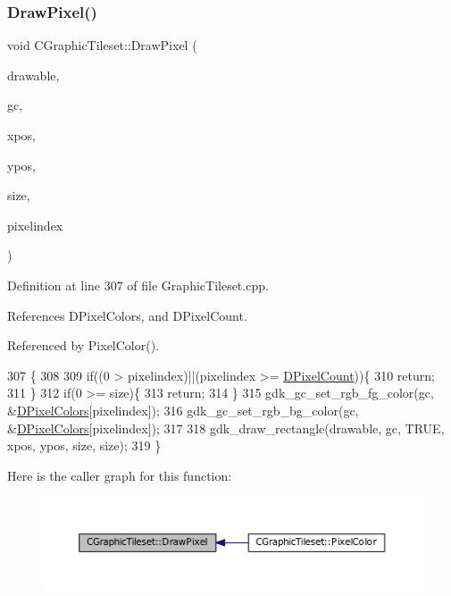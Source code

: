 \subsubsection{\texorpdfstring{Draw\+Pixel()}{DrawPixel()}}
{\footnotesize\ttfamily void C\+Graphic\+Tileset\+::\+Draw\+Pixel (\begin{DoxyParamCaption}\item[{Gdk\+Drawable $\ast$}]{drawable,  }\item[{Gdk\+GC $\ast$}]{gc,  }\item[{gint}]{xpos,  }\item[{gint}]{ypos,  }\item[{int}]{size,  }\item[{int}]{pixelindex }\end{DoxyParamCaption})}



Definition at line 307 of file Graphic\+Tileset.\+cpp.



References D\+Pixel\+Colors, and D\+Pixel\+Count.



Referenced by Pixel\+Color().


\begin{DoxyCode}
307                                                                                                            
          \{
308 
309     \textcolor{keywordflow}{if}((0 > pixelindex)||(pixelindex >= \hyperlink{classCGraphicTileset_a55fc9ceb1c92383c124e61c911fe57db}{DPixelCount}))\{
310         \textcolor{keywordflow}{return};
311     \}
312     \textcolor{keywordflow}{if}(0 >= size)\{
313         \textcolor{keywordflow}{return};
314     \}
315     gdk\_gc\_set\_rgb\_fg\_color(gc, &\hyperlink{classCGraphicTileset_a4e9672b8b133dbac600fb8bb400d1cb3}{DPixelColors}[pixelindex]);
316     gdk\_gc\_set\_rgb\_bg\_color(gc, &\hyperlink{classCGraphicTileset_a4e9672b8b133dbac600fb8bb400d1cb3}{DPixelColors}[pixelindex]);
317     
318     gdk\_draw\_rectangle(drawable, gc, TRUE, xpos, ypos, size, size);
319 \}
\end{DoxyCode}
Here is the caller graph for this function\+:\nopagebreak
\begin{figure}[H]
\begin{center}
\leavevmode
\includegraphics[width=350pt]{classCGraphicTileset_a8acad7ebeb4fad53a72681851f323812_icgraph}
\end{center}
\end{figure}
\hypertarget{classCGraphicTileset_afefd501a74e95295b7cd2dc868dcbbcb}{}\label{classCGraphicTileset_afefd501a74e95295b7cd2dc868dcbbcb} 
